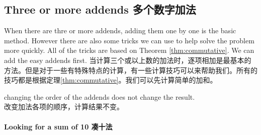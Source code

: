 \subsection{Three or more addends 多个数字加法}
\begin{paracol}{2}
When there are thre or more addends, adding them one by one is the basic method. However there are also some tricks we can use to help solve
the problem more quickly. All of the tricks are based on Theorem \ref{thm:commutative}. We can add the easy addends first. 
\switchcolumn[1]
当计算三个或以上数的加法时，逐项相加是最基本的方法。但是对于一些有特殊特点的计算，有一些计算技巧可以来帮助我们。所有的技巧都是根据定理\ref{thm:commutative}。我们可以先计算简单的加和。
\end{paracol}
\begin{newthem}
\label{thm:commutative}
changing the order of the addends does not change the result.\\
改变加法各项的顺序，计算结果不变。
\end{newthem}

\paragraph{Looking for a sum of 10  凑十法}
\ \  

